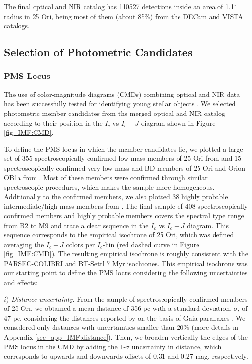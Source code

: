 \documentclass[12pt]{article}
\begin{document}
The final optical and NIR catalog has 110527 detections inside an area of 1.1$^\circ$ radius in 25 Ori, being most of them (about 85\%) from the DECam and VISTA catalogs.

\subsection{Selection of Photometric Candidates}
\label{sec_IMF:candidates}

\subsubsection{PMS Locus}
\label{sec_IMF:locus}
The use of color-magnitude diagrams (\ac{CMD}s) combining optical and NIR data has been successfully tested for identifying young stellar objects \citep[e.g. ][ and references therein]{Downes2014}. We selected photometric member candidates from the merged optical and NIR catalog according to their position in the $I_c$ vs $I_c-J$ diagram shown in Figure \ref{fig_IMF:CMD}.

To define the PMS locus in which the member candidates lie, we plotted a large set of 355 spectroscopically confirmed low-mass members of 25 Ori from \cite{Briceno2005,Briceno2007,Downes2014,Suarez2017,Briceno2018} and 15 spectroscopically confirmed very low mass and BD members of 25 Ori and Orion OB1a from \citet{Downes2015}. Most of these members were confirmed through similar spectroscopic procedures, which makes the sample more homogeneous. Additionally to the confirmed members, we also plotted 38 highly probable intermediate/high-mass members from \cite{Kharchenko2005}. The final sample of 408 spectroscopically confirmed members and highly probable members covers the spectral type range from B2 to M9 and trace a clear sequence in the $I_c$ vs $I_c-J$ diagram. This sequence corresponds to the empirical isochrone of 25 Ori, which was defined averaging the $I_c-J$ colors per $I_c$-bin (red dashed curve in Figure \ref{fig_IMF:CMD}). The resulting empirical isochrone is roughly consistent with the PARSEC-COLIBRI and BT-Settl 7 Myr isochrones. This empirical isochrone was our starting point to define the PMS locus considering the following uncertainties and effects:

$i)$ \emph{Distance uncertainty.} From the sample of spectroscopically confirmed members of 25 Ori, we obtained a mean distance of 356 pc with a standard deviation, $\sigma$, of 47 pc, considering the distances reported by \citet[\ac{BJ18}; ][]{Bailer-Jones2018} on the basis of Gaia parallaxes \citep[Gaia DR2; ][]{GaiaCollaboration2018}. We considered only distances with uncertainties smaller than 20\% (more details in Appendix \ref{sec_app_IMF:distance}). Then, we broaden vertically the edges of the PMS locus in the CMD by adding the 1-$\sigma$ uncertainty in distance, which corresponds to upwards and downwards offsets of 0.31 and 0.27 mag, respectively.
\end{document}
